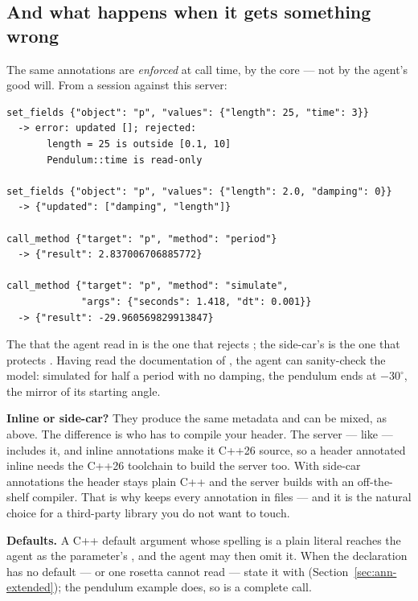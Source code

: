 \subsection*{And what happens when it gets something wrong}

The same annotations are \emph{enforced} at call time, by the core --- not by
the agent's good will. From a session against this server:

\begin{lstlisting}[style=plain]
set_fields {"object": "p", "values": {"length": 25, "time": 3}}
  -> error: updated []; rejected:
       length = 25 is outside [0.1, 10]
       Pendulum::time is read-only

set_fields {"object": "p", "values": {"length": 2.0, "damping": 0}}
  -> {"updated": ["damping", "length"]}

call_method {"target": "p", "method": "period"}
  -> {"result": 2.837006706885772}

call_method {"target": "p", "method": "simulate",
             "args": {"seconds": 1.418, "dt": 0.001}}
  -> {"result": -29.960569829913847}
\end{lstlisting}

The  that the agent read in  is the one that
rejects ; the side-car's  is the one that
protects . Having read the documentation of , the
agent can sanity-check the model: simulated for half a period with no damping,
the pendulum ends at $-30^\circ$, the mirror of its starting angle.

\begin{note}
\textbf{Inline or side-car?} They produce the same metadata and can be mixed,
as above. The difference is who has to compile your header. The 
server --- like  --- includes it, and inline annotations make it
C++26 source, so a header annotated inline needs the C++26 toolchain to build
the server too. With side-car annotations the header stays plain C++ and the
server builds with an off-the-shelf compiler. That is why
 keeps every annotation in  files ---
and it is the natural choice for a third-party library you do not want to
touch.
\end{note}

\begin{note}
\textbf{Defaults.} A C++ default argument whose spelling is a plain literal
reaches the agent as the parameter's , and the agent may then
omit it. When the declaration has no default --- or one rosetta cannot read ---
state it with  (Section~\ref{sec:ann-extended}); the
pendulum example does, so  is a complete call.
\end{note}

